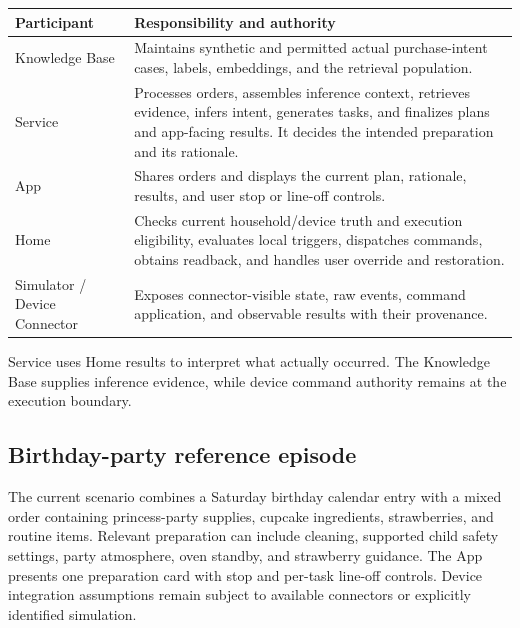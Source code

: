 {\small
\begin{tabularx}{\textwidth}{@{}L{0.23\textwidth}Y@{}}
\toprule
\textbf{Participant} & \textbf{Responsibility and authority} \\
\midrule
Knowledge Base & Maintains synthetic and permitted actual purchase-intent
cases, labels, embeddings, and the retrieval population. \\
Service & Processes orders, assembles inference context, retrieves evidence,
infers intent, generates tasks, and finalizes plans and app-facing results.
It decides the intended preparation and its rationale. \\
App & Shares orders and displays the current plan, rationale, results, and
user stop or line-off controls. \\
Home & Checks current household/device truth and execution eligibility,
evaluates local triggers, dispatches commands, obtains readback, and handles
user override and restoration. \\
Simulator / Device Connector & Exposes connector-visible state, raw events,
command application, and observable results with their provenance. \\
\bottomrule
\end{tabularx}
\par
}

Service uses Home results to interpret what actually occurred. The Knowledge
Base supplies inference evidence, while device command authority remains at
the execution boundary. 

\subsection{Birthday-party reference episode}

The current scenario combines a Saturday birthday calendar entry with a mixed
order containing princess-party supplies, cupcake ingredients, strawberries,
and routine items. Relevant preparation can include cleaning, supported child
safety settings, party atmosphere, oven standby, and strawberry guidance.
The App presents one preparation card with stop and per-task line-off controls.
Device integration assumptions remain subject to available connectors or
explicitly identified simulation. 
